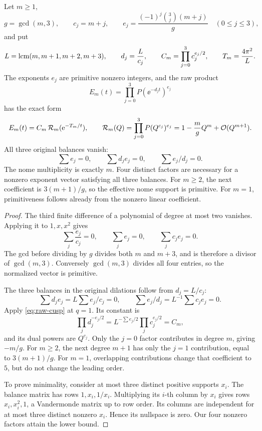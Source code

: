 \begin{theorem}
\label{thm:four-factors}
Let \(m\ge1\),
\[
 g=\gcd(m,3),\qquad
 c_j=m+j,\qquad
 e_j=\frac{(-1)^j\binom3j(m+j)}{g}\quad (0\le j\le3),
\]
and put
\[
 L=\operatorname{lcm}(m,m+1,m+2,m+3),\qquad
 d_j=\frac{L}{c_j},\qquad
 C_m=\prod_{j=0}^3c_j^{e_j/2},\qquad
 T_m=\frac{4\pi^2}{L}.
\]
The exponents \(e_j\) are primitive nonzero integers, and
the raw product
\begin{equation}\label{eq:raw-family}
 E_m(t)=\prod_{j=0}^3P(\ee^{-d_jt})^{e_j}
\end{equation}
has the exact form
\begin{equation}\label{eq:raw-family-dual}
 E_m(t)=C_m\,\mathcal R_m(\mathrm e^{-T_m/t}),\qquad
 \mathcal R_m(Q)=\prod_{j=0}^3P(Q^{c_j})^{e_j}
              =1-\frac{m}{g}Q^m+\mathcal O(Q^{m+1}).
\end{equation}
All three original balances vanish:
\[
 \sum e_j=0,\qquad
 \sum d_je_j=0,\qquad
 \sum e_j/d_j=0.
\]
The nome multiplicity is exactly \(m\).
Four distinct factors are necessary for a nonzero exponent
vector satisfying all three balances.
For \(m\ge2\), the next coefficient is
\(3(m+1)/g\), so the effective nome support is primitive.
For \(m=1\), primitiveness follows already from the nonzero
linear coefficient.
\end{theorem}
\begin{proof}
The third finite difference of a polynomial of degree at most
two vanishes.  Applying it to \(1,x,x^2\) gives
\[
 \sum_j\frac{e_j}{c_j}=0,\qquad
 \sum_je_j=0,\qquad
 \sum_jc_je_j=0.
\]
The gcd before dividing by \(g\) divides both \(m\) and \(m+3\),
and is therefore a divisor of \(\gcd(m,3)\).
Conversely \(\gcd(m,3)\) divides all four entries, so the
normalized vector is primitive.

The three balances in the original dilations follow from
\(d_j=L/c_j\):
\[
 \sum d_je_j=L\sum e_j/c_j=0,\qquad
 \sum e_j/d_j=L^{-1}\sum c_je_j=0.
\]
Apply \cref{eq:raw-cusp} at \(q=1\).
Its constant is
\[
 \prod_jd_j^{-e_j/2}
 =L^{-\sum e_j/2}\prod_jc_j^{e_j/2}=C_m,
\]
and its dual powers are \(Q^{c_j}\).
Only the \(j=0\) factor contributes in degree \(m\),
giving \(-m/g\).  For \(m\ge2\), the next degree
\(m+1\) has only the \(j=1\) contribution, equal to
\(3(m+1)/g\).
For \(m=1\), overlapping contributions change that coefficient
to \(5\), but do not change the leading order.

To prove minimality, consider at most three distinct positive
supports \(x_i\).  The balance matrix has rows
\(1,x_i,1/x_i\).
Multiplying its \(i\)-th column by \(x_i\) gives rows
\(x_i,x_i^2,1\), a Vandermonde matrix up to row order.
Its columns are independent for at most three distinct
nonzero \(x_i\).  Hence its nullspace is zero.
Our four nonzero factors attain the lower bound.
\end{proof}

